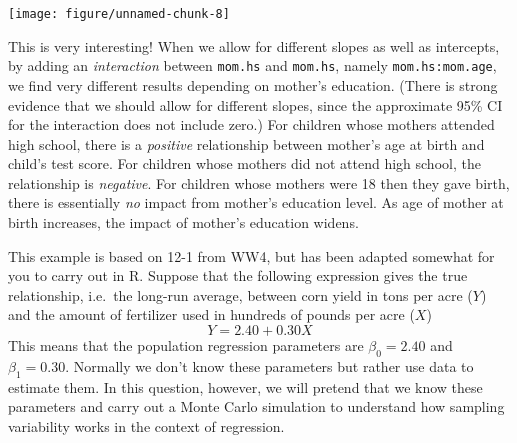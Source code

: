 \documentclass[addpoints,12pt]{exam}\usepackage[]{graphicx}\usepackage[]{color}
\makeatletter
\def\maxwidth{ %
  \ifdim\Gin@nat@width>\linewidth
    \linewidth
  \else
    \Gin@nat@width
  \fi
}
\newcommand{\hlnum}[1]{\textcolor[rgb]{0.686,0.059,0.569}{#1}}%
\newcommand{\hlopt}[1]{\textcolor[rgb]{0,0,0}{#1}}%
\newcommand{\hlstd}[1]{\textcolor[rgb]{0.345,0.345,0.345}{#1}}%
\newcommand{\hlkwa}[1]{\textcolor[rgb]{0.161,0.373,0.58}{\textbf{#1}}}%
\newcommand{\hlkwb}[1]{\textcolor[rgb]{0.69,0.353,0.396}{#1}}%
\newcommand{\hlkwc}[1]{\textcolor[rgb]{0.333,0.667,0.333}{#1}}%
\newcommand{\hlkwd}[1]{\textcolor[rgb]{0.737,0.353,0.396}{\textbf{#1}}}%
\newenvironment{kframe}{%
 \def\at@end@of@kframe{}%
 \ifinner\ifhmode%
  \def\at@end@of@kframe{\end{minipage}}%
  \begin{minipage}{\columnwidth}%
 \fi\fi%
 \def\FrameCommand##1{\hskip\@totalleftmargin \hskip-\fboxsep
 \colorbox{shadecolor}{##1}\hskip-\fboxsep
     \hskip-\linewidth \hskip-\@totalleftmargin \hskip\columnwidth}%
 \MakeFramed {\advance\hsize-\width
   \@totalleftmargin\z@ \linewidth\hsize
   \@setminipage}}%
 {\par\unskip\endMakeFramed%
 \at@end@of@kframe}
\newenvironment{knitrout}{}{} %
\makeatother
\begin{document}
\begin{questions}
\begin{parts}
\begin{solution}
\begin{knitrout}
{\centering \texttt{[image: figure/unnamed-chunk-8]} 

}



\end{knitrout}
This is very interesting! When we allow for different slopes as well as intercepts, by adding an \emph{interaction} between \texttt{mom.hs} and \texttt{mom.hs}, namely \texttt{mom.hs:mom.age}, we find very different results depending on mother's education. (There is strong evidence that we should allow for different slopes, since the approximate 95\% CI for the interaction does not include zero.)  For children whose mothers attended high school, there is a \emph{positive} relationship between mother's age at birth and child's test score. For children whose mothers did not attend high school, the relationship is \emph{negative}. For children whose mothers were 18 then they gave birth, there is essentially \emph{no} impact from mother's education level. As age of mother at birth increases, the impact of mother's education widens. 
\end{solution}
	\end{parts}
	
	
	\question This example is based on 12-1 from WW4, but has been adapted somewhat for you to carry out in R. Suppose that the following expression gives the true relationship, i.e.\ the long-run average, between corn yield in tons per acre ($Y$) and the amount of fertilizer used in hundreds of pounds per acre ($X$)
		$$Y = 2.40 + 0.30 X$$
This means that the population regression parameters are $\beta_0 = 2.40$ and $\beta_1 = 0.30$. Normally we don't know these parameters but rather use data to estimate them. In this question, however, we will pretend that we know these parameters and carry out a Monte Carlo simulation to understand how sampling variability works in the context of regression.
\end{questions}
\end{document}
